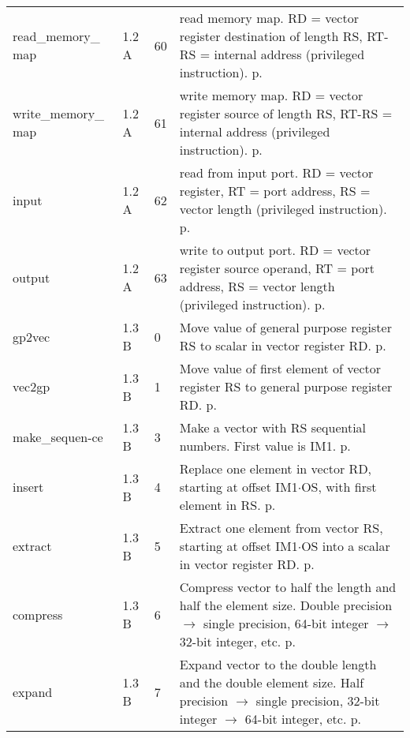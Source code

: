 \documentclass[forwardcom.tex]{subfiles}
\begin{document}
\begin{longtable} {|p{25mm}|p{14mm}|p{10mm}|p{95mm}|}
read\_memory\_ map & 1.2 A & 60 & read memory map. RD = vector register destination of length RS, RT-RS = internal address (privileged instruction). p. \pageref{table:readMemoryMapInstruction} \\
write\_memory\_ map & 1.2 A & 61 & write memory map. RD = vector register source of length RS, RT-RS = internal address (privileged instruction). p. \pageref{table:readMemoryMapInstruction} \\

input         & 1.2 A & 62 & read from input port. RD = vector register, RT = port address, RS = vector length (privileged instruction). p. \pageref{table:inputInstruction} \\
output        & 1.2 A & 63 & write to output port. RD = vector register source operand, RT = port address, RS = vector length (privileged instruction). p. \pageref{table:outputInstruction} \\

gp2vec        & 1.3 B &  0 & Move value of general purpose register RS to scalar in vector register RD. p. \pageref{table:gp2vecInstruction} \\

vec2gp        & 1.3 B &  1 & Move value of first element of vector register RS to general purpose register RD. p. \pageref{table:vec2gpInstruction} \\

make\_sequen-ce& 1.3 B & 3 & Make a vector with RS sequential numbers. First value is IM1. p. \pageref{table:makeSequenceInstruction} \\

insert        & 1.3 B &  4 & Replace one element in vector RD, starting at offset IM1$\cdot$OS, with first element in RS. p. \pageref{table:insertInstruction} \\

extract       & 1.3 B & 5 & Extract one element from vector RS, starting at offset IM1$\cdot$OS into a scalar in vector register RD. p. \pageref{table:extractInstruction} \\

compress      & 1.3 B  &  6 & Compress vector to half the length and half the element size. Double precision $\rightarrow$ single precision, 64-bit
integer $\rightarrow$ 32-bit integer, etc. p. \pageref{table:compressInstruction} \\

expand        & 1.3 B &  7 & Expand vector to the double length and the double element size. Half precision $\rightarrow$ single precision, 32-bit integer $\rightarrow$ 64-bit integer, etc. p. \pageref{table:expandInstruction} \\


\end{longtable}
\end{document}
